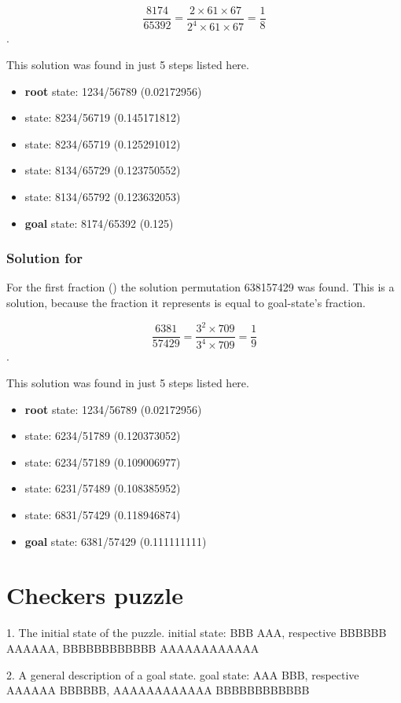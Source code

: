 \documentclass{article}
\begin{document}
\[\frac{8174}{65392} = \frac{2 \times 61 \times 67}{2^4 \times 61
\times 67} = \frac{1}{8}\].

This solution was found in just 5 steps listed here.

\begin{itemize}
  \item \textbf{root} state: 1234/56789 (0.02172956) 
  \item state: 8234/56719 (0.145171812)
  \item state: 8234/65719 (0.125291012)
  \item state: 8134/65729 (0.123750552)
  \item state: 8134/65792 (0.123632053)
  \item \textbf{goal} state: 8174/65392 (0.125)
\end{itemize}


\subsubsection{Solution for }

For the first fraction () the solution permutation 638157429 was
found. This is a solution, because the fraction it represents is equal to
goal-state's fraction.

\[\frac{6381}{57429} = \frac{3^2 \times 709}{3^4 \times 709} = \frac{1}{9}\].

This solution was found in just 5 steps listed here.

\begin{itemize}
  \item \textbf{root} state: 1234/56789 (0.02172956) 
  \item state: 6234/51789 (0.120373052)
  \item state: 6234/57189 (0.109006977)
  \item state: 6231/57489 (0.108385952)
  \item state: 6831/57429 (0.118946874)
  \item \textbf{goal} state: 6381/57429 (0.111111111)
\end{itemize}

\section{Checkers puzzle}
1. The initial state of the puzzle.
initial state: BBB AAA, respective BBBBBB AAAAAA, BBBBBBBBBBBB AAAAAAAAAAAA

2. A general description of a goal state.
goal state: AAA BBB, respective AAAAAA BBBBBB, AAAAAAAAAAAA BBBBBBBBBBBB
\end{document}
